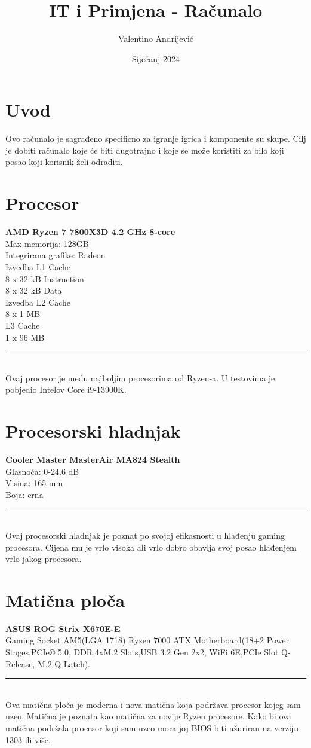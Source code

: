 \documentclass{article}
\title{IT i Primjena - Računalo}
\author{Valentino Andrijević}
\date{Siječanj 2024}
\begin{document}
\maketitle
\tableofcontents
\newpage
\section{Uvod}
Ovo računalo je sagrađeno specificno za igranje igrica i komponente su skupe. Cilj je dobiti računalo koje
će biti dugotrajno i koje se može koristiti za bilo koji posao koji korisnik želi odraditi.

\section{Procesor}
\textbf{AMD Ryzen 7 7800X3D 4.2 GHz 8-core}
\\ Max memorija: 128GB
\\ Integrirana grafike: Radeon
\\ Izvedba L1 Cache
\\ 8 x 32 kB Instruction
\\ 8 x 32 kB Data
\\ Izvedba L2 Cache
\\ 8 x 1 MB
\\ L3 Cache
\\ 1 x 96 MB
\\ \rule{\textwidth}{0.5pt}
\\ Ovaj procesor je među najboljim procesorima od Ryzen-a.
U testovima je pobjedio Intelov Core i9-13900K.

\section{Procesorski hladnjak}
\textbf{Cooler Master MasterAir MA824 Stealth}
\\ Glasnoća: 0-24.6 dB
\\ Visina: 165 mm
\\ Boja: crna
\\ \rule{\textwidth}{0.5pt}
\\ Ovaj procesorski hladnjak je poznat po svojoj efikasnosti u hlađenju gaming procesora.
Cijena mu je vrlo visoka ali vrlo dobro obavlja svoj posao hlađenjem vrlo jakog procesora.

\section{Matična ploča}
\textbf{ASUS ROG Strix X670E-E}
\\ Gaming Socket AM5(LGA 1718) Ryzen 7000 ATX Motherboard(18+2 Power Stages,PCIe® 5.0, DDR,4xM.2 Slots,USB 3.2 Gen 2x2, WiFi 6E,PCIe Slot Q-Release, M.2 Q-Latch).
\\ \rule{\textwidth}{0.5pt}
\\ Ova matična ploča je moderna i nova matična koja podržava procesor kojeg sam uzeo. Matična je poznata kao matična za novije Ryzen procesore. Kako bi ova matična podržala procesor koji sam uzeo mora joj BIOS biti ažuriran na verziju 1303 ili više.
\end{document}

